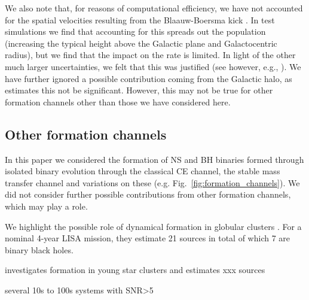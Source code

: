 We also note that, for reasons of computational efficiency, we have not accounted for the spatial velocities resulting from the Blaauw-Boersma kick \citep{Blaauw+1961,Boersma1961}. In test simulations we find that accounting for this spreads out the population (increasing the typical height above the Galactic plane and Galactocentric radius), but we find that the impact on the rate is limited. In light of the other much larger uncertainties, we felt that this was justified (see however, e.g., \citealt{Brandt+1995, Abbott+2017_GW170817_progenitor}). We have further ignored a possible contribution coming from the Galactic halo, as  \citet{Lamberts+2018} estimates this not be significant. However, this may not be true for other formation channels other than those we have considered here.

\subsection{Other formation channels}

In this paper we considered the formation of NS and BH binaries formed through isolated binary evolution through the classical CE channel, the stable mass transfer channel and variations on these (e.g. Fig.~\ref{fig:formation_channels}).  We did not consider further possible contributions from other formation channels, which may play a role.

We highlight the possible role of dynamical formation in globular clusters \citet[e.g.\ ][]{Kremer+2018}. For a nominal 4-year LISA mission, they estimate 21 sources in total of which 7 are binary black holes. 

\citet{Banerjee+2020} investigates formation in young star clusters and estimates xxx sources

several 10s to 100s systems with SNR>5

